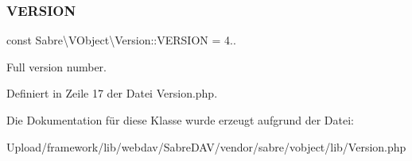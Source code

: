 \subsubsection{\texorpdfstring{V\+E\+R\+S\+I\+ON}{VERSION}}
{\footnotesize\ttfamily const Sabre\textbackslash{}\+V\+Object\textbackslash{}\+Version\+::\+V\+E\+R\+S\+I\+ON = \textquotesingle{}4..\textquotesingle{}}

Full version number. 

Definiert in Zeile 17 der Datei Version.\+php.



Die Dokumentation für diese Klasse wurde erzeugt aufgrund der Datei\+:\begin{DoxyCompactItemize}
\item 
Upload/framework/lib/webdav/\+Sabre\+D\+A\+V/vendor/sabre/vobject/lib/Version.\+php\end{DoxyCompactItemize}
